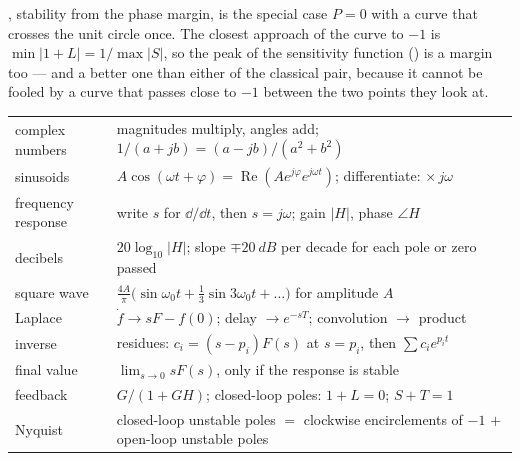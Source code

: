
, stability from the phase margin, is the special case $P = 0$ with a curve that crosses the unit circle once. The closest approach of the curve to $-1$ is $\min|1 + L| = 1/\max|S|$, so the peak of the sensitivity function () is a margin too — and a better one than either of the classical pair, because it cannot be fooled by a curve that passes close to $-1$ between the two points they look at.

\begin{result}
\begin{center}\small
\renewcommand{\arraystretch}{1.4}
\begin{tabularx}{\linewidth}{@{}l>{\raggedright\arraybackslash}X@{}}
complex numbers & magnitudes multiply, angles add; $1/(a + jb) = (a - jb)/(a^2 + b^2)$\\
sinusoids & $A\cos(\omega t + \varphi) = \operatorname{Re}(Ae^{j\varphi}e^{j\omega t})$; differentiate: $\times\,j\omega$\\
frequency response & write $s$ for $\dd/\dd t$, then $s = j\omega$; gain $|H|$, phase $\angle H$\\
decibels & $20\log_{10}|H|$; slope $\mp\SI{20}{dB}$ per decade for each pole or zero passed\\
square wave & $\tfrac{4A}{\pi}\big(\sin\omega_0t + \tfrac13\sin3\omega_0t + \dots\big)$ for amplitude $A$\\
Laplace & $\dot f \to sF - f(0)$; delay $\to e^{-sT}$; convolution $\to$ product\\
inverse & residues: $c_i = (s - p_i)F(s)$ at $s = p_i$, then $\sum c_ie^{p_it}$\\
final value & $\lim_{s \to 0}sF(s)$, only if the response is stable\\
feedback & $G/(1 + GH)$; closed-loop poles: $1 + L = 0$; $S + T = 1$\\
Nyquist & closed-loop unstable poles $=$ clockwise encirclements of $-1$ $+$ open-loop unstable poles\\
\end{tabularx}
\end{center}
\end{result}
